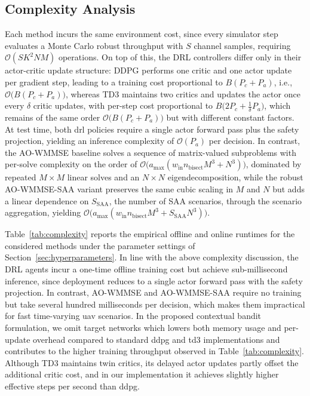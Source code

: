 \documentclass[letterpaper,journal]{IEEEtran}
\begin{document}
\subsection{Complexity Analysis}
\label{ssec:complexity_analysis}

Each method incurs the same environment cost, since every simulator step evaluates a Monte Carlo robust throughput with $S$ channel samples, requiring $\mathcal{O}(S K^2 N M)$ operations. On top of this, the DRL controllers differ only in their actor-critic update structure: DDPG performs one critic and one actor update per gradient step, leading to a training cost proportional to $B(P_c + P_a)$, i.e., $\mathcal{O}\big(B(P_c + P_a)\big)$, whereas TD3 maintains two critics and updates the actor once every $\delta$ critic updates, with per-step cost proportional to $B\big(2P_c + \tfrac{1}{\delta} P_a\big)$, which remains of the same order $\mathcal{O}\big(B(P_c + P_a)\big)$ but with different constant factors. At test time, both \gls{drl} policies require a single actor forward pass plus the safety projection, yielding an inference complexity of $\mathcal{O}(P_a)$ per decision. In contrast, the AO-WMMSE baseline solves a sequence of matrix-valued subproblems with per-solve complexity on the order of $\mathcal{O}\big(a_{\max}(w_{\mathrm{in}} n_{\mathrm{bisect}} M^3 + N^3)\big)$, dominated by repeated $M \times M$ linear solves and an $N \times N$ eigendecomposition, while the robust AO-WMMSE-SAA variant preserves the same cubic scaling in $M$ and $N$ but adds a linear dependence on $S_{\mathrm{SAA}}$, the number of SAA scenarios, through the scenario aggregation, yielding $\mathcal{O}\big(a_{\max}(w_{\mathrm{in}} n_{\mathrm{bisect}} M^3 + S_{\mathrm{SAA}} N^3)\big)$.


Table~\ref{tab:complexity} reports the empirical offline and online runtimes for the considered methods under the parameter settings of Section~\ref{sec:hyperparameters}. In line with the above complexity discussion, the DRL agents incur a one-time offline training cost but achieve sub-millisecond inference, since deployment reduces to a single actor forward pass with the safety projection. In contrast, AO-WMMSE and AO-WMMSE-SAA require no training but take several hundred milliseconds per decision, which makes them impractical for fast time-varying \gls{uav} scenarios. In the proposed contextual bandit formulation, we omit target networks which lowers both memory usage and per-update overhead compared to standard \gls{ddpg} and \gls{td3} implementations and contributes to the higher training throughput observed in Table~\ref{tab:complexity}. Although TD3 maintains twin critics, its delayed actor updates partly offset the additional critic cost, and in our implementation it achieves slightly higher effective steps per second than \gls{ddpg}.
\end{document}
